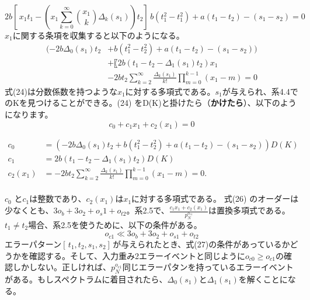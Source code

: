 \documentclass[24 pts]{article}
\begin{document}
\begin{equation}\tag{23}
2b[\,x_1t_1-(x_1\sum_{k=0}^\infty {x_1 \choose k}\Delta_k(s_1))t_2]\, b(t_1^2-t_1^2)+a(t_1-t_2)-(s_1-s_2)=0
\end{equation}
$x_1$に関する条項を収集すると以下のようになる。
\begin{equation}\tag{24}
\begin{split}
(-2b\Delta_0 (s_1 ) t_2&+b(t_1^2-t_2^2)+a(t_1-t_2)-(s_1-s_2))\\
&+〖2b(t_1-t_2-\Delta_1 (s_1 ) t_2)x_1\\
&-2bt_2 \sum_{k=2}^\infty \frac{\Delta_k (s_1 )}{k!} \prod_{m=0}^{k-1}(x_1 -m)=0
\end{split}   
\end{equation}
式(24)は分数係数を持つような$x_1$に対する多項式である。$s_1$が与えられ、系4.4でのKを見つけることができる。(24) をD(K)と掛けたら（\textbf{かけたら}）、以下のようになります。
\begin{equation}\tag{25}
c_0+c_1 x_1+c_2 (x_1 )=0
\end{equation}

\begin{align*}
c_0&=(-2b\Delta_0 (s_1 ) t_2+b(t_1^2-t_2^2)+a(t_1-t_2)-(s_1-s_2))D(K)\\
c_1&=2b(t_1-t_2-\Delta_1 (s_1 ) t_2)D(K)\\
c_2 (x_1 )&=-2bt_2 \sum_{k=2}^\infty \frac{\Delta_k (s_1 )}{k!} \prod_{m=0}^{k-1}(x_1 -m)=0.\tag{26}
\end{align*}
\paragraph{}
$c_0$ と$c_1$は整数であり、$c_2 (x_1 )$は$x_1$に対する多項式である。
式(26) のオーダーは少なくとも、$3o_b+3o_2+o_s1+o_{t2}$。系2.5で、$\frac{c_1 x_1+c_2 (x_1 )}{p_N^{o_{c1} }}$は置換多項式である。$t_1\neq t_2$場合、系2.5を使うために、以下の条件がある。
\begin{equation}　\tag{27}
o_{c1}\ll3o_b+3o_2+o_{s1}+o_{t2}\end{equation}							
エラーパターン$[\,t_1 , t_2  , s_1 ,  s_2]\,$が与えられたとき、式(27)の条件があっているかどうかを確認する。そして、入力重み2エラーイベントと同じように$o_{c0}  \geq o_{c1}$の確認しかしない。正しければ、$p_N^{o_{c1}}$同じエラーパタンを持っているエラーイベントがある。もしスペクトラムに着目されたら、$\Delta_0 (s_1 )$と$\Delta_1 (s_1 )$を解くことになる。
\end{document}
